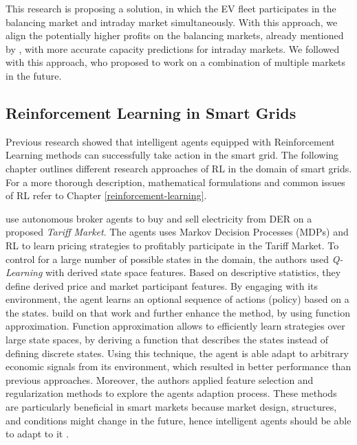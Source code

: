 \documentclass[12pt, article]{article}
\begin{document}
This research is proposing a solution, in which the EV fleet participates in the
balancing market and intraday market simultaneously. With this approach, we
align the potentially higher profits on the balancing markets, already mentioned
by \textcite{tomic07_using_fleet_elect_drive_vehic_grid_suppor}, with more
accurate capacity predictions for intraday markets. We followed
\textcite{kahlen17_fleet} with this approach, who proposed to work on a combination
of multiple markets in the future.

\subsection{Reinforcement Learning in Smart Grids}
\label{sec:org07d4fb9}

Previous research showed that intelligent agents equipped with Reinforcement
Learning methods can successfully take action in the smart grid. The following
chapter outlines different research approaches of RL in the domain of smart
grids. For a more thorough description, mathematical formulations and common
issues of RL refer to Chapter \ref{reinforcement-learning}.

\textcite{reddy11_learn_behav_multip_auton_agent,reddy11_strat} use autonomous
broker agents to buy and sell electricity from DER on a proposed \emph{Tariff
Market}. The agents uses Markov Decision Processes (MDPs) and RL to learn pricing
strategies to profitably participate in the Tariff Market. To control for a
large number of possible states in the domain, the authors used \emph{Q-Learning}
with derived state space features. Based on descriptive statistics, they define
derived price and market participant features. By engaging with its
environment, the agent learns an optional sequence of actions (policy) based on
a the states. \textcite{peters13_reinf_learn_approac_to_auton} build on that work
and further enhance the method, by using function approximation. Function
approximation allows to efficiently learn strategies over large state spaces, by
deriving a function that describes the states instead of defining discrete
states. Using this technique, the agent is able adapt to arbitrary economic
signals from its environment, which resulted in better performance than previous
approaches. Moreover, the authors applied feature selection and regularization
methods to explore the agents adaption process. These methods are particularly
beneficial in smart markets because market design, structures, and conditions
might change in the future, hence intelligent agents should be able to adapt to
it \parencite{peters13_reinf_learn_approac_to_auton}.
\end{document}

